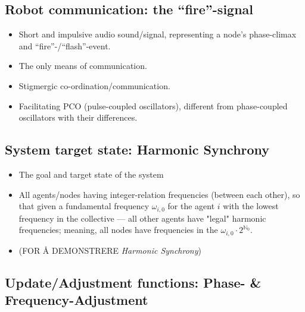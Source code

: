 	\subsection{Robot communication: the ``fire''-signal}
	\label{subsec:fire_signal}
		\begin{itemize}
			\item Short and impulsive audio sound/signal, representing a node's phase-climax and ``fire''-/``flash''-event.
			\item The only means of communication.
			\item Stigmergic co-ordination/communication.
			\item Facilitating PCO (pulse-coupled oscillators), different from phase-coupled oscillators with their differences.
		\end{itemize}

	

	\subsection{System target state: Harmonic Synchrony}
	\label{subsec:harmonic_synchrony}
		\begin{itemize}
			\item The goal and target state of the system
			\item All agents/nodes having integer-relation frequencies (between each other), so that given a fundamental frequency $\omega_{i,0}$ for the agent $i$ with the lowest frequency in the collective — all other agents have "legal" harmonic frequencies; meaning, all nodes have frequencies in the  $\omega_{i,0} \cdot 2^{\mathbb{N}_0}$.
			\item (FOR Å DEMONSTRERE \textit{Harmonic Synchrony}) 
		\end{itemize}
	
	
	\subsection{Update/Adjustment functions: Phase- \& Frequency-Adjustment}
	\label{subsec:update_functions}
	
